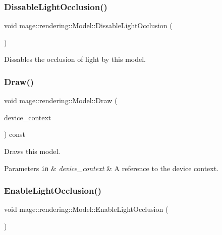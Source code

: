 \subsubsection{\texorpdfstring{Dissable\+Light\+Occlusion()}{DissableLightOcclusion()}}
{\footnotesize\ttfamily void mage\+::rendering\+::\+Model\+::\+Dissable\+Light\+Occlusion (\begin{DoxyParamCaption}{ }\end{DoxyParamCaption})\hspace{0.3cm}{\ttfamily [noexcept]}}

Dissables the occlusion of light by this model. \mbox{\label{classmage_1_1rendering_1_1_model_aaa10d71022d4f6ac8e51ec95861f3317}} 
\subsubsection{\texorpdfstring{Draw()}{Draw()}}
{\footnotesize\ttfamily void mage\+::rendering\+::\+Model\+::\+Draw (\begin{DoxyParamCaption}\item[{I\+D3\+D11\+Device\+Context \&}]{device\+\_\+context }\end{DoxyParamCaption}) const\hspace{0.3cm}{\ttfamily [noexcept]}}

Draws this model.


\begin{DoxyParams}[1]{Parameters}
\mbox{\tt in}  & {\em device\+\_\+context} & A reference to the device context. \\
\hline
\end{DoxyParams}
\mbox{\label{classmage_1_1rendering_1_1_model_a6fc53c4d0d5983ecd2f1910002b4dcfc}} 
\subsubsection{\texorpdfstring{Enable\+Light\+Occlusion()}{EnableLightOcclusion()}}
{\footnotesize\ttfamily void mage\+::rendering\+::\+Model\+::\+Enable\+Light\+Occlusion (\begin{DoxyParamCaption}{ }\end{DoxyParamCaption})\hspace{0.3cm}{\ttfamily [noexcept]}}

